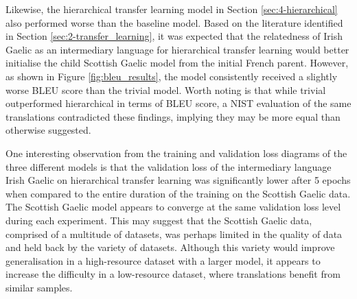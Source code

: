 Likewise, the hierarchical transfer learning model in Section \ref{sec:4-hierarchical} also performed worse than the baseline model. Based on the literature identified in Section \ref{sec:2-transfer_learning}, it was expected that the relatedness of Irish Gaelic as an intermediary language for hierarchical transfer learning would better initialise the child Scottish Gaelic model from the initial French parent. However, as shown in Figure \ref{fig:bleu_results}, the model consistently received a slightly worse \acrshort{BLEU} score than the trivial model. Worth noting is that while trivial outperformed hierarchical in terms of \acrshort{BLEU} score, a \acrshort{NIST} evaluation of the same translations contradicted these findings, implying they may be more equal than otherwise suggested.

One interesting observation from the training and validation loss diagrams of the three different models is that the validation loss of the intermediary language Irish Gaelic on hierarchical transfer learning was significantly lower after 5 epochs when compared to the entire duration of the training on the Scottish Gaelic data. The Scottish Gaelic model appears to converge at the same validation loss level during each experiment. This may suggest that the Scottish Gaelic data, comprised of a multitude of datasets, was perhaps limited in the quality of data and held back by the variety of datasets. Although this variety would improve generalisation in a high-resource dataset with a larger model, it appears to increase the difficulty in a low-resource dataset, where translations benefit from similar samples.